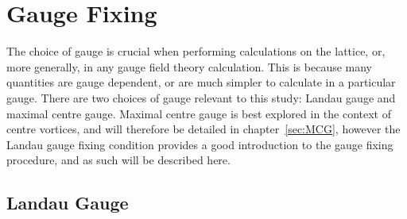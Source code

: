 \section{Gauge Fixing}
The choice of gauge is crucial when performing calculations on the lattice, or, more generally, in any gauge field theory calculation. This is because many quantities are gauge dependent, or are much simpler to calculate in a particular gauge. There are two choices of gauge relevant to this study: Landau gauge and maximal centre gauge. Maximal centre gauge is best explored in the context of centre vortices, and will therefore be detailed in chapter~\ref{sec:MCG}, however the Landau gauge fixing condition provides a good introduction to the gauge fixing procedure, and as such will be described here.

\subsection{Landau Gauge}\label{sec:LandauGauge}

